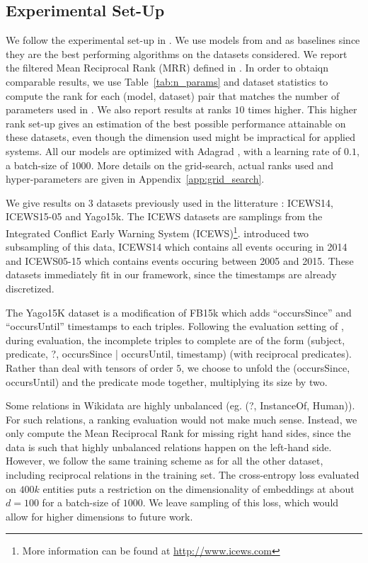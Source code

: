 \documentclass{article}
\begin{document}
\subsection{Experimental Set-Up}
\label{sec:exp}
We follow the experimental set-up in \citet{garcia2018learning, goel2019diachronic}. We use models from \citet{garcia2018learning} and \citet{goel2019diachronic} as baselines since they are the best performing algorithms on the datasets considered. We report the filtered Mean Reciprocal Rank (MRR) defined in \citet{nickel_holographic_2015}. In order to obtaiqn comparable results, we use Table~\ref{tab:n_params} and dataset statistics to compute the rank for each (model, dataset) pair that matches the number of parameters used in \citet{goel2019diachronic}. We also report results at ranks $10$ times higher. This higher rank set-up gives an estimation of the best possible performance attainable on these datasets, even though the dimension used might be impractical for applied systems. All our models are optimized with Adagrad \citep{duchi_adaptive_2011}, with a learning rate of $0.1$, a batch-size of $1000$. More details on the grid-search, actual ranks used and hyper-parameters are given in Appendix~\ref{app:grid_search}.

We give results on $3$ datasets previously used in the litterature : ICEWS14, ICEWS15-05 and Yago15k. The ICEWS datasets are samplings from the  Integrated Conflict Early Warning System (ICEWS)\citep{icewsdataset}\footnote{More information can be found at \url{http://www.icews.com}}.\citet{garcia2018learning} introduced two subsampling of this data, ICEWS14 which contains all events occuring in 2014 and ICEWS05-15 which contains events occuring between 2005 and 2015. These datasets immediately fit in our framework, since the timestamps are already discretized.

The Yago15K dataset \citep{garcia2018learning} is a modification of FB15k \citep{bordes_translating_2013} which adds ``occursSince'' and ``occursUntil'' timestamps to each triples. Following the evaluation setting of \citet{garcia2018learning}, during evaluation, the incomplete triples to complete are of the form (subject, predicate, ?, {occursSince | occursUntil}, timestamp) (with reciprocal predicates). Rather than deal with tensors of order $5$, we choose to unfold the (occursSince,  occursUntil) and the predicate mode together, multiplying its size by two.

Some relations in Wikidata are highly unbalanced (eg. (?, InstanceOf, Human)). For such relations, a ranking evaluation would not make much sense. Instead, we only compute the Mean Reciprocal Rank for missing right hand sides, since the data is such that highly unbalanced relations happen on the left-hand side. However, we follow the same training scheme as for all the other dataset, including reciprocal relations in the training set. The cross-entropy loss evaluated on $400k$ entities puts a restriction on the dimensionality of embeddings at about $d=100$ for a batch-size of $1000$. We leave sampling of this loss, which would allow for higher dimensions to future work.
\end{document}
